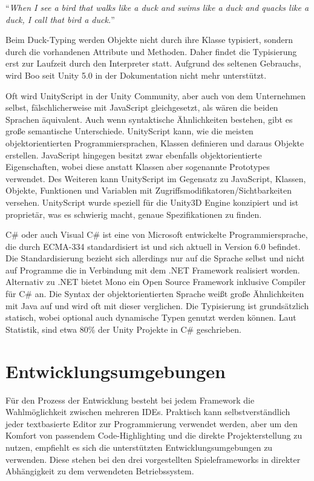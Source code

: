\bigskip
“\emph{When I see a bird that walks like a duck and swims like a duck and quacks like a duck, I call that bird a duck.}” \citep{ducktest}

\bigskip
Beim Duck-Typing werden Objekte nicht durch ihre Klasse typisiert, sondern durch die vorhandenen Attribute und Methoden. Daher findet die Typisierung erst zur Laufzeit durch den Interpreter statt. Aufgrund des seltenen Gebrauchs, wird Boo seit Unity 5.0 in der Dokumentation nicht mehr unterstützt.

\bigskip
Oft wird UnityScript in der Unity Community, aber auch von dem Unternehmen selbst, fälschlicherweise mit JavaScript gleichgesetzt, als wären die beiden Sprachen äquivalent. Auch wenn syntaktische Ähnlichkeiten bestehen, gibt es große semantische Unterschiede.
UnityScript kann, wie die meisten objektorientierten Programmiersprachen, Klassen definieren und daraus Objekte erstellen. JavaScript hingegen besitzt zwar ebenfalls objektorientierte Eigenschaften, wobei diese anstatt Klassen aber sogenannte Prototypes verwendet. Des Weiteren kann UnityScript im Gegensatz zu JavaScript, Klassen, Objekte, Funktionen und Variablen mit Zugriffsmodifikatoren/Sichtbarkeiten versehen. UnityScript wurde speziell für die Unity3D Engine konzipiert und ist proprietär, was es schwierig macht, genaue Spezifikationen zu finden. \citep{unity_unityscript_vs_javascript}

\bigskip
C\# oder auch Visual C\# ist eine von Microsoft entwickelte Programmiersprache, die durch ECMA-334 standardisiert ist und sich aktuell in Version 6.0 befindet. Die Standardisierung bezieht sich allerdings nur auf die Sprache selbst und nicht auf Programme die in Verbindung mit dem .NET Framework realisiert worden. Alternativ zu .NET bietet Mono ein Open Source Framework inklusive Compiler für C\# an. Die Syntax der objektorientierten Sprache weißt große Ähnlichkeiten mit Java auf und wird oft mit dieser verglichen. Die Typisierung ist grundsätzlich statisch, wobei optional auch dynamische Typen genutzt werden können. \citep{csharp_in_depth}
Laut Statistik, sind etwa 80\% der Unity Projekte in C\# geschrieben. \citep{unity_languages}

\section{Entwicklungsumgebungen}
Für den Prozess der Entwicklung besteht bei jedem Framework die Wahlmöglichkeit zwischen mehreren IDEs. Praktisch kann selbstverständlich jeder textbasierte Editor zur Programmierung verwendet werden, aber um den Komfort von passendem Code-Highlighting und die direkte Projekterstellung zu nutzen, empfiehlt es sich die unterstützten Entwicklungsumgebungen zu verwenden. Diese stehen bei den drei vorgestellten Spieleframeworks in direkter Abhängigkeit zu dem verwendeten Betriebssystem.

